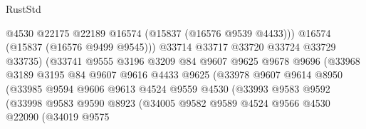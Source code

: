 \begin{lexlean}{RustStd}
\begin{coremodule}
{\begin{coremodule}
{{{{{{{{{{{{{{{{{{{{{{{{{{{{{{{{{{{{{{{{{{{{{{{{{{{{{{{{{{{{                                      @4530
                                      @22175
                                      @22189
                                      @16574
                                      (@15837 (@16576 @9539 @4433)))
                                    @16574
                                    (@15837 (@16576 @9499 @9545)))
                                  @33714
                                  @33717
                                  @33720
                                  @33724
                                  @33729
                                  @33735)
                                (@33741
                                  @9555
                                  @3196
                                  @3209
                                  @84
                                  @9607
                                  @9625
                                  @9678
                                  @9696
                                  (@33968
                                    @3189
                                    @3195
                                    @84
                                    @9607
                                    @9616
                                    @4433
                                    @9625
                                    (@33978
                                      @9607
                                      @9614
                                      @8950
                                      (@33985
                                        @9594
                                        @9606
                                        @9613
                                        @4524
                                        @9559
                                        @4530
                                        (@33993
                                          @9583
                                          @9592
                                          (@33998
                                            @9583
                                            @9590
                                            @8923
                                            (@34005
                                              @9582
                                              @9589
                                              @4524
                                              @9566
                                              @4530
                                              @22090
                                              (@34019
                                                @9575
}}}}}}}}}}}}}}}}}}}}}}}}}}}}}}}}}}}}}}}}}}}}}}}}}}}}}}}}}}}}
\end{coremodule}}
\end{coremodule}
\end{lexlean}
